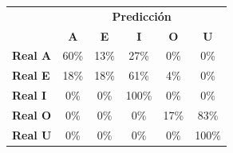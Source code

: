 \begin{tabular}{lccccc}
\toprule
 & \multicolumn{5}{c}{\textbf{Predicción}} \\
 & \textbf{A} & \textbf{E} & \textbf{I} & \textbf{O} & \textbf{U} \\
\midrule
\textbf{Real A} & \cellcolor[rgb]{0.58,0.58,1.00} \color{white} 60\% & \cellcolor[rgb]{0.91,0.91,1.00}  13\% & \cellcolor[rgb]{0.81,0.81,1.00}  27\% & \cellcolor[rgb]{1.00,1.00,1.00}  0\% & \cellcolor[rgb]{1.00,1.00,1.00}  0\% \\
\textbf{Real E} & \cellcolor[rgb]{0.88,0.88,1.00}  18\% & \cellcolor[rgb]{0.88,0.88,1.00}  18\% & \cellcolor[rgb]{0.58,0.58,1.00} \color{white} 61\% & \cellcolor[rgb]{0.97,0.97,1.00}  4\% & \cellcolor[rgb]{1.00,1.00,1.00}  0\% \\
\textbf{Real I} & \cellcolor[rgb]{1.00,1.00,1.00}  0\% & \cellcolor[rgb]{1.00,1.00,1.00}  0\% & \cellcolor[rgb]{0.30,0.30,1.00} \color{white} 100\% & \cellcolor[rgb]{1.00,1.00,1.00}  0\% & \cellcolor[rgb]{1.00,1.00,1.00}  0\% \\
\textbf{Real O} & \cellcolor[rgb]{1.00,1.00,1.00}  0\% & \cellcolor[rgb]{1.00,1.00,1.00}  0\% & \cellcolor[rgb]{1.00,1.00,1.00}  0\% & \cellcolor[rgb]{0.88,0.88,1.00}  17\% & \cellcolor[rgb]{0.42,0.42,1.00} \color{white} 83\% \\
\textbf{Real U} & \cellcolor[rgb]{1.00,1.00,1.00}  0\% & \cellcolor[rgb]{1.00,1.00,1.00}  0\% & \cellcolor[rgb]{1.00,1.00,1.00}  0\% & \cellcolor[rgb]{1.00,1.00,1.00}  0\% & \cellcolor[rgb]{0.30,0.30,1.00} \color{white} 100\% \\
\bottomrule
\end{tabular}
